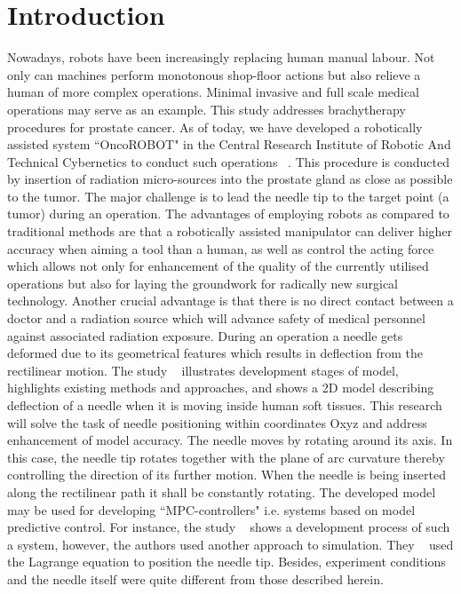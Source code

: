 \documentclass[a4paper]{jpconf}
\begin{document}
\section{Introduction}
Nowadays, robots have been increasingly replacing human manual labour. Not only can machines perform monotonous shop-floor actions but also relieve a human of more complex operations. Minimal invasive and full scale medical operations may serve as an example. This study addresses brachytherapy procedures for prostate cancer. As of today, we have developed a robotically assisted system ``OncoROBOT" in the Central Research Institute of Robotic And Technical Cybernetics to conduct such operations ~\cite{one, two}. This procedure is conducted by insertion of radiation micro-sources into the prostate gland as close as possible to the tumor.  The major challenge is to lead the needle tip to the target point (a tumor) during an operation. The advantages of employing robots as compared to traditional methods are that a robotically assisted manipulator can deliver higher accuracy when aiming a tool than a human, as well as control the acting force which allows not only for enhancement of the quality of the currently utilised operations but also for laying the groundwork for radically new surgical technology. Another crucial advantage is that there is no direct contact between a doctor and a radiation source which will advance safety of medical personnel against associated radiation exposure. During an operation a needle gets deformed due to its geometrical features which results in deflection from the rectilinear motion. The study ~\cite{Model} illustrates development stages  of model, highlights existing methods and approaches, and shows a 2D model describing deflection of a needle when it is moving inside human soft tissues. This research will solve the task of needle positioning within coordinates Oxyz and address enhancement of model accuracy. The needle moves by rotating around its axis. In this case, the needle tip rotates together with the plane of arc curvature thereby controlling the direction of its further motion. When the needle is being inserted along the rectilinear path it shall be constantly rotating. The developed model may be used for developing ``MPC-controllers" i.e. systems based on model predictive control. For instance, the study ~\cite{four} shows a development process of such a system, however, the authors used another approach to simulation. They ~\cite{four} used the Lagrange equation to position the needle tip. Besides, experiment conditions and the needle itself were quite different from those described herein.
\end{document}
